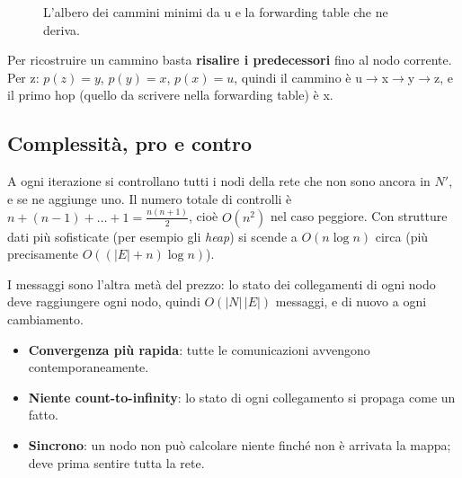 \begin{figure}[H]
\centering
{}
\caption{L'albero dei cammini minimi da u e la forwarding table che ne deriva.}
\end{figure}

Per ricostruire un cammino basta \textbf{risalire i predecessori} fino al nodo corrente. Per z: $p(z) = y$, $p(y) = x$, $p(x) = u$,
quindi il cammino è u$\rightarrow$x$\rightarrow$y$\rightarrow$z, e il primo hop (quello da scrivere nella forwarding table) è x.

\subsection{Complessità, pro e contro}

A ogni iterazione si controllano tutti i nodi della rete che non sono ancora in $N'$, e se ne aggiunge uno. Il numero totale di
controlli è $n + (n-1) + \dots + 1 = \frac{n(n+1)}{2}$, cioè $O(n^2)$ nel caso peggiore. Con strutture dati più sofisticate (per
esempio gli \emph{heap}) si scende a $O(n \log n)$ circa (più precisamente $O((|E| + n)\log n)$).

I messaggi sono l'altra metà del prezzo: lo stato dei collegamenti di ogni nodo deve raggiungere ogni nodo, quindi
$O(|N|\,|E|)$ messaggi, e di nuovo a ogni cambiamento.

\begin{itemize}
    \item[\itick] \textbf{Convergenza più rapida}: tutte le comunicazioni avvengono contemporaneamente.
    \item[\itick] \textbf{Niente count-to-infinity}: lo stato di ogni collegamento si propaga come un fatto.
    \item[\icross] \textbf{Sincrono}: un nodo non può calcolare niente finché non è arrivata la mappa; deve prima sentire tutta la
          rete.
\end{itemize}


